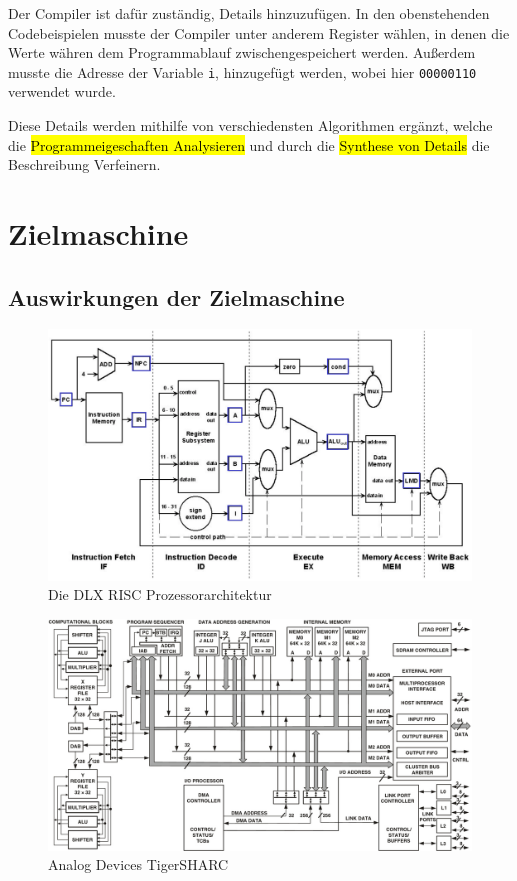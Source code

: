 \documentclass[ngerman]{scrartcl}
\begin{document}
Der Compiler ist dafür zuständig, Details hinzuzufügen. In den obenstehenden Codebeispielen musste der Compiler unter anderem Register wählen, in denen die Werte währen dem Programmablauf zwischengespeichert werden. Außerdem musste die Adresse der Variable \verb|i|, hinzugefügt werden, wobei hier \verb|00000110| verwendet wurde.

Diese Details werden mithilfe von verschiedensten Algorithmen ergänzt, welche die \hl{Programmeigeschaften Analysieren} und durch die \hl{Synthese von Details} die Beschreibung Verfeinern.

\section{Zielmaschine}

\subsection{Auswirkungen der Zielmaschine}

\begin{figure}
\includegraphics[width=\textwidth]{media/dlx}
\caption{Die DLX RISC Prozessorarchitektur}
\end{figure}
\begin{figure}
\includegraphics[width=\textwidth]{media/tigersharc}
\caption{Analog Devices TigerSHARC}
\end{figure}
\end{document}
